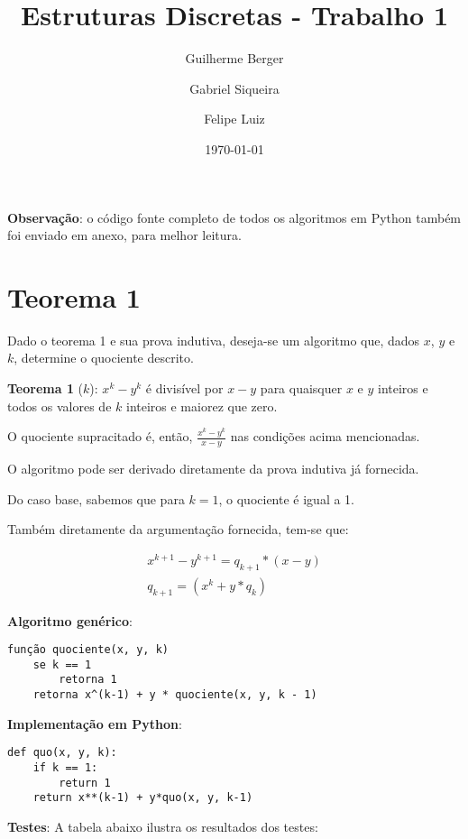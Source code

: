 \documentclass{article}
\title{Estruturas Discretas - Trabalho 1}
\author{Guilherme Berger \and Gabriel Siqueira \and Felipe Luiz}
\date{\today}
\begin{document}
\maketitle

\textbf{Observação}: o código fonte completo de todos os algoritmos em Python também foi enviado em anexo, para melhor leitura.

\section{Teorema 1}

Dado o teorema 1 e sua prova indutiva, deseja-se um algoritmo que, dados $x$, $y$ e $k$, determine o quociente descrito.

\textbf{Teorema 1} ($k$): $x^k - y^k$ é divisível por $x-y$ para quaisquer $x$ e $y$ inteiros e todos os valores de $k$ inteiros e maiorez que zero.

O quociente supracitado é, então, $\frac{x^k - y^k}{x-y}$ nas condições acima mencionadas.

O algoritmo pode ser derivado diretamente da prova indutiva já fornecida.

Do caso base, sabemos que para $k = 1$, o quociente é igual a 1.

Também diretamente da argumentação fornecida, tem-se que:

\begin{gather}
x^{k+1} - y^{k+1} = q_{k+1} * (x - y) \\
q_{k+1} = (x^k + y * q_k)
\end{gather}

\textbf{Algoritmo genérico}:

{\color{ogreen}
\begin{verbatim}
função quociente(x, y, k)
    se k == 1
        retorna 1
    retorna x^(k-1) + y * quociente(x, y, k - 1)
\end{verbatim}
}

\textbf{Implementação em Python}:

{\color{red}
\begin{verbatim}
def quo(x, y, k):
    if k == 1:
        return 1
    return x**(k-1) + y*quo(x, y, k-1)
\end{verbatim}
}

\pagebreak

\textbf{Testes}: A tabela abaixo ilustra os resultados dos testes:
\end{document}
